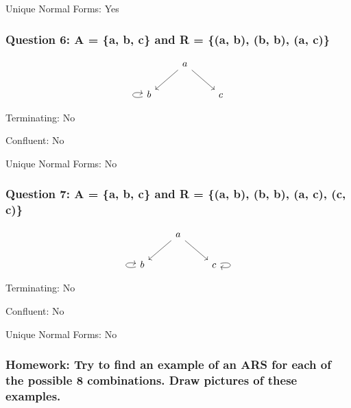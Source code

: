 \documentclass{article}
\theoremstyle{theorem}
\theoremstyle{definition}
\theoremstyle{remark}
\begin{document}
Unique Normal Forms: Yes

\subsubsection*{Question 6: A = \{a, b, c\} and R = \{(a, b), (b, b), (a, c)\}}

\[
\begin{tikzcd}
& a \arrow[ld] \arrow[rd] & \\
b \arrow[loop left]{} & & c
\end{tikzcd}
\]

Terminating: No

Confluent: No

Unique Normal Forms: No

\subsubsection*{Question 7: A = \{a, b, c\} and R = \{(a, b), (b, b), (a, c), (c, c)\}}

\[
\begin{tikzcd}
& a \arrow[ld] \arrow[rd] & \\
b \arrow[loop left]{} & & c \arrow[loop right]{}
\end{tikzcd}
\]

Terminating: No

Confluent: No

Unique Normal Forms: No

\subsubsection*{Homework: Try to find an example of an ARS for each of the possible 8 combinations. Draw pictures of these examples.}
\end{document}
